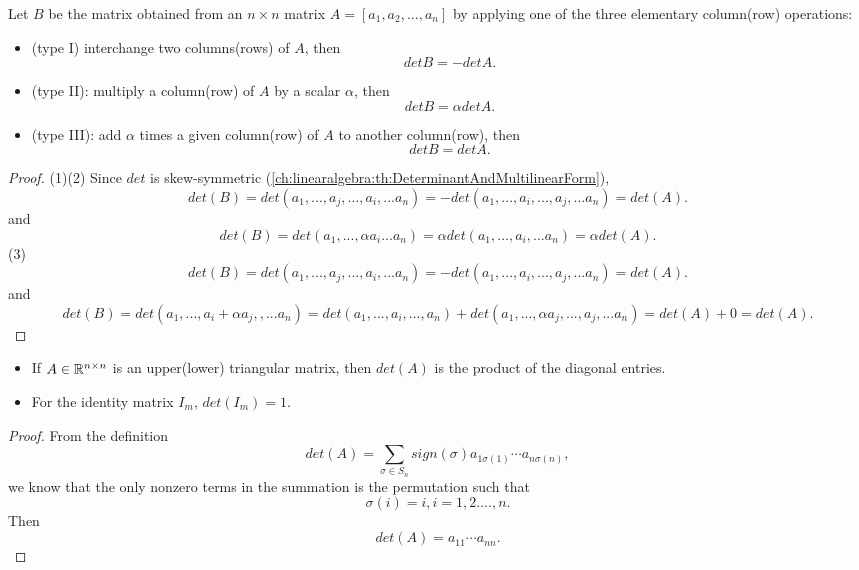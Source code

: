 \begin{refsection}
\begin{theorem}\cite[282]{banerjee2014linear}
	Let $B$ be the matrix obtained from an $n\times n$ matrix $A=[a_1,a_2,...,a_n]$ by applying one of the three elementary column(row) operations:
	\begin{itemize}
		\item (type I) interchange two columns(rows) of $A$, then
		$$det{B} = -det{A}.$$
		\item (type II): multiply a column(row) of $A$ by a scalar $\alpha$, then
		$$det{B} = \alpha det{A}.$$
		\item (type III): add $\alpha$ times a given column(row) of $A$ to another column(row), then
		$$det{B} = det{A}.$$
	\end{itemize}
\end{theorem}
\begin{proof}
(1)(2) Since $det$ is skew-symmetric (\autoref{ch:linearalgebra:th:DeterminantAndMultilinearForm}),
$$det(B) = det(a_1,...,a_j,...,a_i,...a_n) = -det(a_1,...,a_i,...,a_j,...a_n) = det(A).$$
and
$$det(B) = det(a_1,...,\alpha a_i...a_n) = \alpha det(a_1,...,a_i,...a_n) = \alpha det(A).$$
(3)$$det(B) = det(a_1,...,a_j,...,a_i,...a_n) = -det(a_1,...,a_i,...,a_j,...a_n) = det(A).$$
and
$$det(B) = det(a_1,...,a_i + \alpha a_j,,...a_n) = det(a_1,...,a_i,...,a_n)+det(a_1,...,\alpha a_j,...,a_j,...a_n) = det(A) + 0 = det(A).$$
\end{proof}


\begin{lemma}\hfill\label{ch:linearalgebra:th:DeterminantOfTriangularMatrix}
\begin{itemize}
	\item If $A\in \mathbb{R}^{n\times n}$ is an upper(lower) triangular matrix, then $det(A)$ is the product of the diagonal entries.
	\item For the identity matrix $I_{m}$, $det(I_m) = 1$.
\end{itemize}	
\end{lemma}
\begin{proof}
From the definition
	$$det(A) = \sum_{\sigma \in S_n} sign(\sigma)a_{1\sigma(1)}\cdots a_{n\sigma(n)},$$
we know that the only nonzero terms in the summation is the permutation such that
$$\sigma(i) = i, i=1,2....,n.$$
Then
	$$det(A) = a_{11}\cdots a_{nn}.$$
\end{proof}




\end{refsection}
